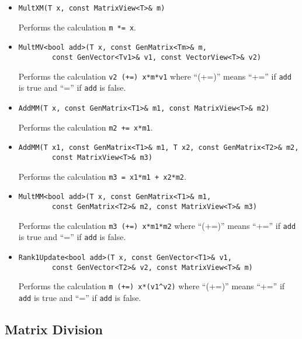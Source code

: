 \documentclass[twoside,letterpaper,11pt]{article}
\renewcommand{\tt}[1]{{\texttt {#1}}}
\begin{document}
\begin{itemize}

\item
\begin{verbatim}
MultXM(T x, const MatrixView<T>& m)
\end{verbatim}
Performs the calculation \tt{m *= x}.

\item
\begin{verbatim}
MultMV<bool add>(T x, const GenMatrix<Tm>& m, 
        const GenVector<Tv1>& v1, const VectorView<T>& v2)
\end{verbatim}
Performs the calculation \tt{v2 (+=) x*m*v1} where ``(+=)'' means ``+='' 
if \tt{add} is true and ``='' if \tt{add} is false.

\item
\begin{verbatim}
AddMM(T x, const GenMatrix<T1>& m1, const MatrixView<T>& m2)
\end{verbatim}
Performs the calculation \tt{m2 += x*m1}.

\item
\begin{verbatim}
AddMM(T x1, const GenMatrix<T1>& m1, T x2, const GenMatrix<T2>& m2,
        const MatrixView<T>& m3)
\end{verbatim}
Performs the calculation \tt{m3 = x1*m1 + x2*m2}.

\item
\begin{verbatim}
MultMM<bool add>(T x, const GenMatrix<T1>& m1, 
        const GenMatrix<T2>& m2, const MatrixView<T>& m3)
\end{verbatim}
Performs the calculation \tt{m3 (+=) x*m1*m2} where ``(+=)'' means ``+='' 
if \tt{add} is true and ``='' if \tt{add} is false.

\item
\begin{verbatim}
Rank1Update<bool add>(T x, const GenVector<T1>& v1, 
        const GenVector<T2>& v2, const MatrixView<T>& m)
\end{verbatim}
Performs the calculation \tt{m (+=) x*(v1\^{}v2)} where ``(+=)'' means ``+='' 
if \tt{add} is true and ``='' if \tt{add} is false.

\end{itemize}

\subsection{Matrix Division}
\label{division}
\end{document}
